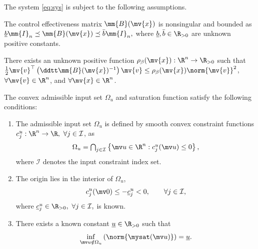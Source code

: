 \documentclass[letterpaper, journal]{IEEEtran}
\begin{document}
The system \eqref{eq:sys} is subject to the following assumptions.

\begin{assum} \label{assum:B:bound}
  The control effectiveness matrix $\mm{B}(\mv{x})$ is nonsingular and bounded as   
  $
    \underline{b}\mm{I}_n
    \preceq 
    \mm{B}(\mv{x})
    \preceq 
    \bar{b}\mm{I}_n
    ,
  $
  where $\underline{b},\bar{b}\in\R_{>0}$ are unknown positive constants.
\end{assum}

\begin{assum} \label{assum:B:bound:grad}
  There exists an unknown positive function $\rho_{\beta}(\mv{x}):\R^n\to\R_{>0}$ such that $\tfrac{1}{2}\mv{v}^\top\left(\ddtt\mm{B}(\mv{x})^{-1}\right)\mv{v} \le \rho_{\beta}(\mv{x})\norm{\mv{v}}^2$, $\forall \mv{v}\in\R^n$, and $\forall \mv{x}\in\R^n$. 
\end{assum}

\begin{assum} \label{assum:sat}
  The convex admissible input set $\Omega_u$ and saturation function satisfy the following conditions:
  \begin{enumerate}
    \item
    The admissible input set $\Omega_u$ is defined by smooth convex constraint functions $c_j^u:\R^n\to\R,\ \forall j\in\mathcal I$, as
    \begin{equation*}
      \Omega_u
      =
      \textstyle
      \bigcap_{j\in\mathcal I}
      \left\{
        \mv u\in\R^n:
        c_j^u(\mv u)\le 0
      \right\}
      ,
    \end{equation*}
    where $\mathcal I$ denotes the input constraint index set.

    \item
    The origin lies in the interior of $\Omega_u$, \ie
    \begin{equation*}
      c_j^u(\mv 0)
      \le
      -\underline c_j^u
      <
      0
      ,
      \qquad
      \forall j\in\mathcal I
      ,
    \end{equation*}
    where $\underline c_j^u\in\R_{>0},\ \forall j\in\mathcal I,$ is known.

    \item
    There exists a known constant $\underline u\in\R_{>0}$ such that
    \begin{equation*}
      \inf_{\mv u\notin\Omega_u}
      \left(
        \norm{\mysat(\mv u)}
      \right)
      =
      \underline u
      .
    \end{equation*}
  \end{enumerate}
\end{assum}
\end{document}
